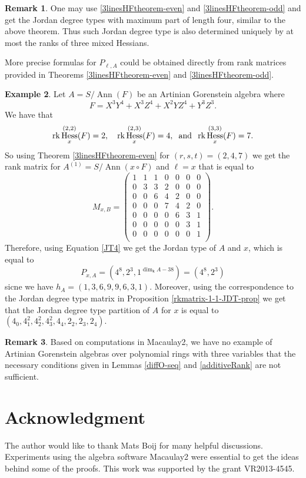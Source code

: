 \documentclass[12pt]{amsart}
\numberwithin{equation}{section}
\theoremstyle{plain} \newtheorem{theorem}{Theorem}[section]
\theoremstyle{definition} \newtheorem{definition}[theorem]{Definition}
\newtheorem{example}[theorem]{Example} \newtheorem{remark}[theorem]{Remark}
\DeclareMathOperator{\Hess}{Hess}\DeclareMathOperator{\rk}{rk}
\DeclareMathOperator{\ann}{Ann}\DeclareMathOperator{\Char}{char}
\begin{document}
\begin{remark}
One may use  \ref{3linesHFtheorem-even} and \ref{3linesHFtheorem-odd} and get the Jordan degree types with maximum part of length four, similar to the above theorem. Thus such Jordan degree type is also determined uniquely by at most the ranks of three mixed Hessians.\par
More precise formulas for $P_{\ell,A}$ could be obtained directly from rank matrices provided in Theorems \ref{3linesHFtheorem-even} and \ref{3linesHFtheorem-odd}. 
\end{remark}
\begin{example}
Let $A=S/\ann(F)$ be an Artinian Gorenstein algebra where $$F=X^3Y^4+X^3Z^4+X^2YZ^4+Y^3Z^3.$$ We have that 
$$\rk\Hess^{(2,2)}_x(F)=2, \quad \rk\Hess^{(2,3)}_x(F)=4, \hspace*{2mm}\text{and}\hspace*{2mm}\rk\Hess^{(3,3)}_x(F)=7.$$
So using Theorem \ref{3linesHFtheorem-even} for $(r,s,t)=(2,4,7)$ we get the rank matrix for $A^{(1)}=S/\ann(x\circ F)$ and $\ell=x$ that is equal to
$$M_{x,B}= \begin{pmatrix}
1&1&1&0&0&0&0\\
0&3&3&2&0&0&0\\
0&0&6&4&2&0&0\\
0&0&0&7&4&2&0\\
0&0&0&0&6&3&1\\
0&0&0&0&0&3&1\\
0&0&0&0&0&0&1\\
\end{pmatrix}.
$$
Therefore, using  Equation \ref{JT4} we get the Jordan type of $A$ and $x$, which is equal to
$$
P_{x,A}=(4^8,2^3, 1^{\dim_{\mathsf{k}}A-38})= (4^8,2^3)
$$
sicne we have $h_A=(1,3,6,9,9,6,3,1)$.
Moreover, using the correspondence to the Jordan degree type matrix in Proposition \ref{rkmatrix-1-1-JDT-prop} we get that the Jordan degree type partition of $A$ for $x$ is equal to $(4_0,4_1^2,4_2^2,4_3^2,4_4,2_2, 2_3,2_4).$
\end{example}
\begin{remark}
Based on computations in Macaulay2, we have no example of Artinian Gorenstein algebras over polynomial rings with three variables that the necessary conditions given in Lemmas \ref{diffO-seq} and \ref{additiveRank} are not sufficient.
\end{remark}


\section{Acknowledgment}
The author would like to thank Mats Boij for many helpful discussions. Experiments using the algebra software Macaulay2 \cite{Mac2} were essential to get the ideas behind some of the proofs. This work was supported by the grant VR2013-4545. 
{}

\end{document}
